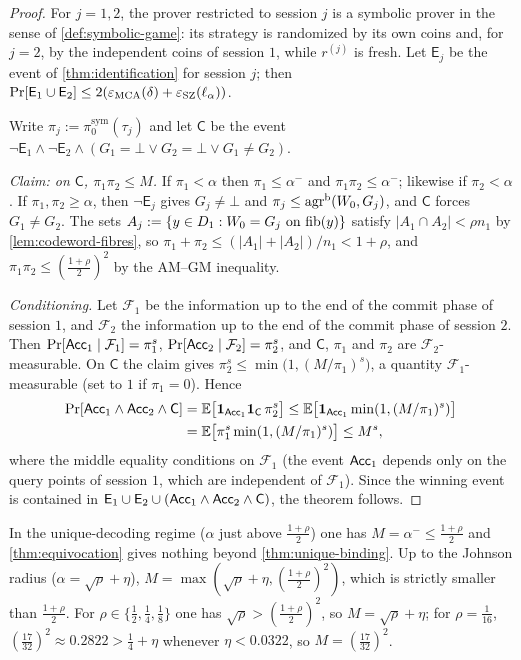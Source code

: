 \begin{proof}
For $j=1,2$, the prover restricted to session $j$ is a symbolic prover in the sense of
\cref{def:symbolic-game}: its strategy is randomized by its own coins and, for $j=2$, by
the independent coins of session $1$, while $r^{(j)}$ is fresh. Let $\mathsf E_j$ be the
event of \cref{thm:identification} for session $j$; then
$\Pr[\mathsf E_1\cup\mathsf E_2]\le2(\varepsilon_{\mathrm{MCA}}(\delta)+\varepsilon_{\mathrm{SZ}}(\ell_\alpha))$.

Write $\pi_j:=\pi^{\mathrm{sym}}_0(\tau_j)$ and let $\mathsf C$ be the event
$\neg\mathsf E_1\wedge\neg\mathsf E_2\wedge(G_1=\bot\vee G_2=\bot\vee G_1\ne G_2)$.

\emph{Claim: on $\mathsf C$, $\pi_1\pi_2\le M$.} If $\pi_1<\alpha$ then
$\pi_1\le\alpha^-$ and $\pi_1\pi_2\le\alpha^-$; likewise if $\pi_2<\alpha$. If
$\pi_1,\pi_2\ge\alpha$, then $\neg\mathsf E_j$ gives $G_j\ne\bot$ and
$\pi_j\le\mathrm{agr}^{\mathrm{b}}(W_0,G_j)$, and $\mathsf C$ forces $G_1\ne G_2$. The sets
$A_j:=\{y\in D_1:W_0=G_j\text{ on }\mathrm{fib}(y)\}$ satisfy
$|A_1\cap A_2|<\rho n_1$ by \cref{lem:codeword-fibres}, so
$\pi_1+\pi_2\le(|A_1|+|A_2|)/n_1<1+\rho$, and
$\pi_1\pi_2\le(\frac{1+\rho}2)^2$ by the AM--GM inequality.

\emph{Conditioning.} Let $\mathcal F_1$ be the information up to the end of the commit
phase of session $1$, and $\mathcal F_2$ the information up to the end of the commit
phase of session $2$. Then $\Pr[\mathsf{Acc}_1\mid\mathcal F_1]=\pi_1^s$,
$\Pr[\mathsf{Acc}_2\mid\mathcal F_2]=\pi_2^s$, and $\mathsf C$, $\pi_1$ and $\pi_2$ are
$\mathcal F_2$-measurable. On $\mathsf C$ the claim gives
$\pi_2^s\le\min\bigl(1,(M/\pi_1)^s\bigr)$, a quantity $\mathcal F_1$-measurable
(set to $1$ if $\pi_1=0$). Hence
\begin{align*}
\Pr[\mathsf{Acc}_1\wedge\mathsf{Acc}_2\wedge\mathsf C]
&=\mathbb E\bigl[\mathbf 1_{\mathsf{Acc}_1}\mathbf 1_{\mathsf C}\,\pi_2^s\bigr]
\le\mathbb E\bigl[\mathbf 1_{\mathsf{Acc}_1}\min(1,(M/\pi_1)^s)\bigr]\\
&=\mathbb E\bigl[\pi_1^s\min(1,(M/\pi_1)^s)\bigr]\le M^s ,
\end{align*}
where the middle equality conditions on $\mathcal F_1$ (the event $\mathsf{Acc}_1$ depends only on
the query points of session $1$, which are independent of $\mathcal F_1$). Since the
winning event is contained in $\mathsf E_1\cup\mathsf E_2\cup(\mathsf{Acc}_1\wedge\mathsf{Acc}_2\wedge\mathsf C)$,
the theorem follows.
\end{proof}

\begin{remark}\label{rem:equivocation-regimes}
In the unique-decoding regime ($\alpha$ just above $\frac{1+\rho}2$) one has
$M=\alpha^-\le\frac{1+\rho}2$ and \cref{thm:equivocation} gives nothing beyond
\cref{thm:unique-binding}. Up to the Johnson radius ($\alpha=\sqrt\rho+\eta$),
$M=\max(\sqrt\rho+\eta,(\frac{1+\rho}2)^2)$, which is strictly smaller than
$\frac{1+\rho}2$. For $\rho\in\{\frac12,\frac14,\frac18\}$ one has
$\sqrt\rho>(\frac{1+\rho}2)^2$, so $M=\sqrt\rho+\eta$; for $\rho=\frac1{16}$,
$(\frac{17}{32})^2\approx0.2822>\frac14+\eta$ whenever $\eta<0.0322$, so
$M=(\frac{17}{32})^2$.
\end{remark}

